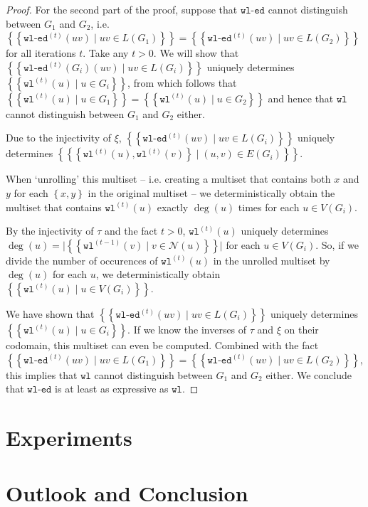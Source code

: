 \documentclass{article}
\newcommand{\set}[1]{\left\{#1\right\}}
\newcommand{\multiset}[1]{\left\{\!\!\left\{#1\right\}\!\!\right\}}
\newcommand{\iter}[1]{^{(#1)}}
\newcommand{\wl}{\texttt{wl}}
\newcommand{\wledge}{\texttt{wl-ed}}
\newcommand{\dec}{\xi}
\newcommand{\hash}{\tau}
\newcommand{\nbh}{\mathcal{N}}
\begin{document}
\begin{proof}
    For the second part of the proof, suppose that $\wledge$ cannot distinguish between $G_1$ and $G_2$, i.e. $\multiset{\wledge\iter{t}(uv) \mid uv\in L(G_1)} = \multiset{\wledge\iter{t}(uv) \mid uv\in L(G_2)}$ for all iterations $t$. Take any $t>0$.
    We will show that $\multiset{\wledge\iter{t}(G_i)(uv) \mid uv\in L(G_i)}$ uniquely determines $\multiset{\wl\iter{t}(u) \mid u\in G_i}$, from which follows that $\multiset{\wl\iter{t}(u) \mid u\in G_1} = \multiset{\wl\iter{t}(u) \mid u\in G_2}$ and hence that $\wl$ cannot distinguish between $G_1$ and $G_2$ either.
    
    Due to the injectivity of $\dec$,
    $\multiset{\wledge\iter{t}(uv) \mid uv\in L(G_i)}$
    uniquely determines
    $\multiset{\set{\wl\iter{t}(u), \wl\iter{t}(v)} \mid (u,v)\in E(G_i)}$.

    When `unrolling' this multiset -- i.e. creating a multiset that contains both $x$ and $y$ for each $\set{x,y}$ in the original multiset -- we deterministically obtain the multiset that contains $\wl\iter{t}(u)$ exactly $\deg(u)$ times for each $u\in V(G_i)$.

    By the injectivity of $\hash$ and the fact $t>0$, $\wl\iter{t}(u)$ uniquely determines $\deg(u) = \lvert\multiset{\wl\iter{t-1}(v) \mid v\in \nbh(u)}\rvert$ for each $u\in V(G_i)$. So, if we divide the number of occurences of $\wl\iter{t}(u)$ in the unrolled multiset by $\deg(u)$ for each $u$, we deterministically obtain $\multiset{\wl\iter{t}(u) \mid u\in V(G_i)}$.

    We have shown that $\multiset{\wledge\iter{t}(uv) \mid uv\in L(G_i)}$ uniquely determines $\multiset{\wl\iter{t}(u) \mid u\in G_i}$. If we know the inverses of $\hash$ and $\dec$ on their codomain, this multiset can even be computed. Combined with the fact $\multiset{\wledge\iter{t}(uv) \mid uv\in L(G_1)} = \multiset{\wledge\iter{t}(uv) \mid uv\in L(G_2)}$, this implies that $\wl$ cannot distinguish between $G_1$ and $G_2$ either. We conclude that $\wledge$ is at least as expressive as $\wl$.
\end{proof}



\section{Experiments}



\section{Outlook and Conclusion}





\end{document}
